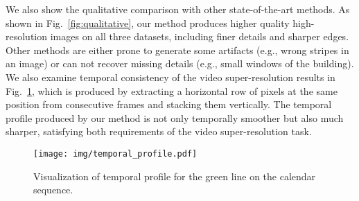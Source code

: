 We also show the qualitative comparison with other state-of-the-art methods. As shown in Fig.~\ref{fig:qualitative}, our method produces higher quality high-resolution images on all three datasets, including finer details and sharper edges. Other methods are either prone to generate some artifacts (e.g., wrong stripes in an image) or can not recover missing details (e.g., small windows of the building).
We also examine temporal consistency of the video super-resolution results in Fig.~\ref{fig:profile}, which is produced by extracting a horizontal row of pixels at the same position from consecutive frames and stacking them vertically. The temporal profile produced by our method is not only temporally smoother but also much sharper, satisfying both requirements of the video super-resolution task.

\begin{figure}[t]
	\centering
	\texttt{[image: img/temporal\_profile.pdf]}
	\caption{Visualization of temporal profile for the green line on the calendar sequence. 
	}
	\label{fig:profile}
 	\vspace{-3mm}
\end{figure}
